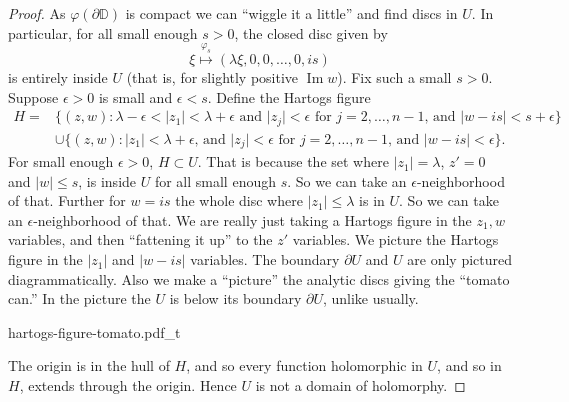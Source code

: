 \documentclass[12pt,openany]{book}
\renewcommand{\Im}{\operatorname{Im}}
\newcommand{\sabs}[1]{\lvert {#1} \rvert}
\newcommand{\D}{{\mathbb{D}}}
\theoremstyle{plain}
\theoremstyle{remark}
\theoremstyle{definition}
\newenvironment{myfig}{%
    \begin{center}
}{%
    \end{center}
}
\theoremstyle{exercise}
\theoremstyle{example}
\begin{document}
\begin{proof}
As $\varphi(\partial \D)$ is compact we can ``wiggle it a little'' and
find discs in $U$.  In particular, for all small enough $s > 0$,
the closed disc given by
\begin{equation*}
\xi \overset{\varphi_s}{\mapsto} (\lambda \xi, 0, 0, \ldots, 0, i s) 
\end{equation*}
is entirely inside $U$ (that is, for slightly positive $\Im w$).
Fix such a small $s > 0$.
Suppose $\epsilon > 0$ is small and $\epsilon < s$.
Define the Hartogs figure
\begin{equation*}
\begin{split}
H =
& \bigl\{ (z,w) : \lambda - \epsilon < \sabs{z_1} < \lambda + \epsilon
\text{ and }
\sabs{z_j} < \epsilon \text{ for $j=2,\ldots,n-1$, and }
\sabs{w-is} < s+\epsilon \bigr\} 
\\
&
\cup 
\bigl\{ (z,w) : \sabs{z_1} < \lambda + \epsilon \text{, and } \sabs{z_j} < \epsilon \text{ for $j=2,\ldots,n-1$, and }
\sabs{w-is} < \epsilon \bigr\} .
\end{split}
\end{equation*}
For small enough $\epsilon >0$, $H \subset U$.
That is because the set where $\sabs{z_1} = \lambda$, $z' = 0$
and $\sabs{w} \leq s$, is inside $U$ for all small enough $s$.  So we can
take an $\epsilon$-neighborhood of that.
Further for
$w = is$ the whole disc where $\sabs{z_1} \leq \lambda$ is in $U$.
So we can take an $\epsilon$-neighborhood of that.
We are really just taking a Hartogs figure in the $z_1,w$ variables, and then
``fattening it up'' to the $z'$ variables.
We picture the Hartogs figure in the $\sabs{z_1}$ and $\sabs{w-is}$
variables.  The boundary $\partial U$ and $U$ are only pictured diagrammatically.
Also we make a ``picture'' the analytic discs giving the ``tomato can.''
In the picture the $U$ is below its boundary $\partial U$, unlike usually.

\begin{myfig}
{hartogs-figure-tomato.pdf_t}
\end{myfig}

The origin is in the hull of $H$, and so
every function holomorphic in $U$, and so in $H$, extends through the origin.
Hence $U$ is not a domain of holomorphy.
\end{proof}
\end{document}
